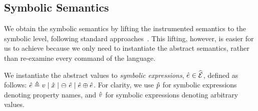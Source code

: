 %




\vspace*{-0.2cm}
\subsection{\jsil Symbolic Semantics}\label{subsec:symb:semantics}

We obtain the \jsil symbolic semantics by lifting the \jsil instrumented semantics to the symbolic level, following standard approaches~\cite{Rosette1}.
This lifting, however, is easier for us to achieve because we only need to instantiate the abstract semantics, rather than re-examine every command of the language.

We instantiate the abstract values to \emph{symbolic expressions}, $\hat{e} \in \widehat{\text{$\mathcal{E}$}}$, defined as follows: 
$\hat{e} \triangleq v \mid \hat{x} \mid \ominus\ \hat{e} \mid \hat{e} \oplus \hat{e}$. 
For clarity, we use $\hat{p}$ for symbolic expressions denoting property names, and $\hat{v}$ for symbolic
expressions denoting arbitrary values. 


